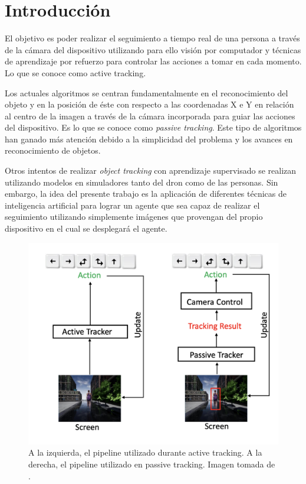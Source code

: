 
\cleardoublepage

\chapter{Introducción}
\label{introduccion}

El objetivo es poder realizar el seguimiento a tiempo real de una persona a través de la cámara del dispositivo utilizando para ello visión por computador y técnicas de aprendizaje por refuerzo para controlar las acciones a tomar en cada momento. Lo que se conoce como active tracking. 
\medskip

Los actuales algoritmos se centran fundamentalmente en el reconocimiento del objeto y en la posición de éste con respecto a las coordenadas X e Y en relación al centro de la imagen a través de la cámara incorporada para guiar las acciones del dispositivo. Es lo que se conoce como \textit{passive tracking}. Este tipo de algoritmos han ganado más atención debido a la simplicidad del problema y los avances en reconocimiento de objetos.
\medskip

Otros intentos de realizar \textit{object tracking} con aprendizaje supervisado se realizan utilizando modelos en simuladores tanto del dron como de las personas. Sin embargo, la idea del presente trabajo es la aplicación de diferentes técnicas de inteligencia artificial para lograr un agente que sea capaz de realizar el seguimiento utilizando simplemente imágenes que provengan del propio dispositivo en el cual se desplegará el agente.
\medskip

\begin{figure}[ht!]
\centering
\includegraphics[scale=0.4]{figuras/active_tracking_vs_passive_tracking.png}
\caption[A la izquierda, el pipeline utilizado durante active tracking. A la derecha, el pipeline utilizado en passive tracking.]{A la izquierda, el pipeline utilizado durante active tracking. A la derecha, el pipeline utilizado en passive tracking. Imagen tomada de \citet{luo2019end}.}
\label{fig-active-tracking}
\end{figure}
\medskip


